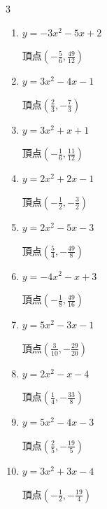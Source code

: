 \begin{multicols}{3}
\begin{enumerate}
        $\displaystyle 頂点\left( -\frac{3}{10} , -\frac{89}{20} \right)$

  \item $\displaystyle y=-3x^{2}-5x+2$

        $\displaystyle 頂点\left( -\frac{5}{6} , \frac{49}{12} \right)$

  \item $\displaystyle y=3x^{2}-4x-1$

        $\displaystyle 頂点\left( \frac{2}{3} , -\frac{7}{3} \right)$

\columnbreak %

\resetques

  \item $\displaystyle y=3x^{2}+x+1$

        $\displaystyle 頂点\left( -\frac{1}{6} , \frac{11}{12} \right)$

  \item $\displaystyle y=2x^{2}+2x-1$

        $\displaystyle 頂点\left( -\frac{1}{2} , -\frac{3}{2} \right)$

  \item $\displaystyle y=2x^{2}-5x-3$

        $\displaystyle 頂点\left( \frac{5}{4} , -\frac{49}{8} \right)$

  \item $\displaystyle y=-4x^{2}-x+3$

        $\displaystyle 頂点\left( -\frac{1}{8} , \frac{49}{16} \right)$

  \item $\displaystyle y=5x^{2}-3x-1$

        $\displaystyle 頂点\left( \frac{3}{10} , -\frac{29}{20} \right)$

\columnbreak %

  \item $\displaystyle y=2x^{2}-x-4$

        $\displaystyle 頂点\left( \frac{1}{4} , -\frac{33}{8} \right)$

  \item $\displaystyle y=5x^{2}-4x-3$

        $\displaystyle 頂点\left( \frac{2}{5} , -\frac{19}{5} \right)$

  \item $\displaystyle y=3x^{2}+3x-4$

        $\displaystyle 頂点\left( -\frac{1}{2} , -\frac{19}{4} \right)$


\end{enumerate}
\end{multicols}
